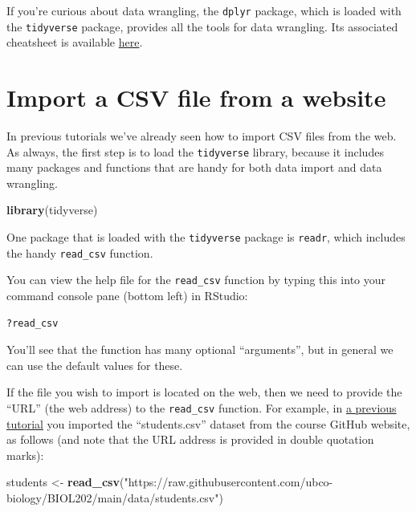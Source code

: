 \documentclass[
]{book}
\newenvironment{Shaded}{\begin{snugshade}}{\end{snugshade}}
\newcommand{\FunctionTok}[1]{\textcolor[rgb]{0.13,0.29,0.53}{\textbf{#1}}}
\newcommand{\NormalTok}[1]{#1}
\newcommand{\OtherTok}[1]{\textcolor[rgb]{0.56,0.35,0.01}{#1}}
\newcommand{\StringTok}[1]{\textcolor[rgb]{0.31,0.60,0.02}{#1}}
\begin{document}
If you're curious about data wrangling, the \texttt{dplyr} package, which is loaded with the \texttt{tidyverse} package, provides all the tools for data wrangling. Its associated cheatsheet is available \href{https://www.google.com/url?sa=t&rct=j&q=&esrc=s&source=web&cd=&ved=2ahUKEwiDxcv5zI_6AhWBFzQIHaFDCuMQFnoECBoQAQ&url=https\%3A\%2F\%2Fwww.rstudio.com\%2Fwp-content\%2Fuploads\%2F2015\%2F02\%2Fdata-wrangling-cheatsheet.pdf&usg=AOvVaw3YtyAQzCrVUXwp7frfnZC5}{here}.

\section{Import a CSV file from a website}\label{import_csv_url}

In previous tutorials we've already seen how to import CSV files from the web. As always, the first step is to load the \texttt{tidyverse} library, because it includes many packages and functions that are handy for both data import and data wrangling.

\begin{Shaded}
\begin{Highlighting}[]
\FunctionTok{library}\NormalTok{(tidyverse)}
\end{Highlighting}
\end{Shaded}

One package that is loaded with the \texttt{tidyverse} package is \texttt{readr}, which includes the handy \texttt{read\_csv} function.

You can view the help file for the \texttt{read\_csv} function by typing this into your command console pane (bottom left) in RStudio:

\begin{verbatim}
?read_csv
\end{verbatim}

You'll see that the function has many optional ``arguments'', but in general we can use the default values for these.

If the file you wish to import is located on the web, then we need to provide the ``URL'' (the web address) to the \texttt{read\_csv} function. For example, in \hyperref[example_answer]{a previous tutorial} you imported the ``students.csv'' dataset from the course GitHub website, as follows (and note that the URL address is provided in double quotation marks):

\begin{Shaded}
\begin{Highlighting}[]
\NormalTok{students }\OtherTok{\textless{}{-}} \FunctionTok{read\_csv}\NormalTok{(}\StringTok{"https://raw.githubusercontent.com/ubco{-}biology/BIOL202/main/data/students.csv"}\NormalTok{)}
\end{Highlighting}
\end{Shaded}
\end{document}
